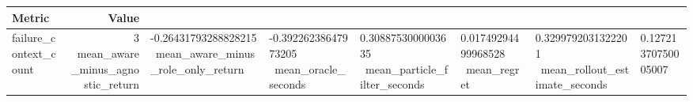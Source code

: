 \begin{tabular}{lr}
\hline
Metric & Value \\
\hline
failure\_context\_count & 3 \
mean\_aware\_minus\_agnostic\_return & -0.26431793288828215 \
mean\_aware\_minus\_role\_only\_return & -0.39226238647973205 \
mean\_oracle\_seconds & 0.3088753000003635 \
mean\_particle\_filter\_seconds & 0.01749294499968528 \
mean\_regret & 0.3299792031322201 \
mean\_rollout\_estimate\_seconds & 0.12721370750005007 \
\hline
\end{tabular}
